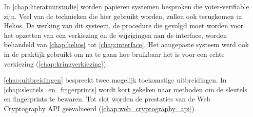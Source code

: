 \npar In \ref{chap:literatuurstudie} worden papieren systemen besproken die voter-verifiable zijn. Veel van de technieken die hier gebruikt worden, zullen ook terugkomen in Helios. De werking van dit systeem, de procedure die gevolgd moet worden voor het opzetten van een verkiezing en de wijzigingen aan de interface, worden behandeld van \ref{chap:helios} tot \ref{chap:interface}. Het aangepaste systeem werd ook in de praktijk gebruikt om na te gaan hoe bruikbaar het is voor een echte verkiezing (\ref{chap:kringverkiezing}). 

\npar \ref{chap:uitbreidingen} bespreekt twee mogelijk toekomstige uitbreidingen. In \ref{chap:sleutels_en_fingerprints} wordt kort gekeken naar methoden om de sleutels en fingerprints te bewaren. Tot slot worden de prestaties van de Web Cryptography API ge\"evalueerd (\ref{chap:web_cryptography_api}).
